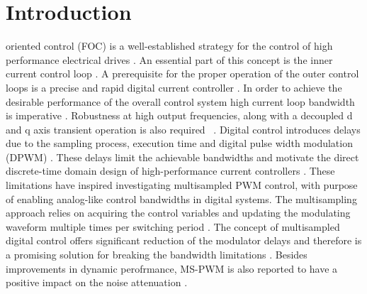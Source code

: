 \documentclass[journal]{IEEEtran}
\begin{document}
\section{Introduction}
 oriented control (FOC) is a well-established strategy for the control of high performance electrical drives \cite{holmes2012}. An essential part of this concept is the inner current control loop \cite{holmes2009}. A prerequisite for the proper operation of the outer control loops is a precise and rapid digital current controller \cite{yepes2014}. In order to achieve the desirable performance of the overall control system high current loop bandwidth is imperative \cite{choi1998}. Robustness at high output frequencies, along with a decoupled d and q axis transient operation is also required ~\cite{choi1998,hoffmann2016,yim2009}. Digital control introduces delays due to the sampling process, execution time and digital pulse width modulation (DPWM) \cite{holmes2009}. These delays limit the achievable bandwidths and motivate the direct discrete-time domain design of high-performance current controllers \cite{bae2003}. These limitations have inspired investigating multisampled PWM control, with purpose of enabling analog-like control bandwidths in digital systems. The multisampling approach relies on acquiring the control variables and updating the modulating waveform multiple times per switching period \cite{corradini_analysis}. The concept of multisampled digital control offers significant reduction of the modulator delays and therefore is a promising solution for breaking the bandwidth limitations \cite{corradini2018}. Besides improvements in dynamic perofrmance, MS-PWM is also reported to have a positive impact on the noise attenuation \cite{petric2020}. 
\end{document}
